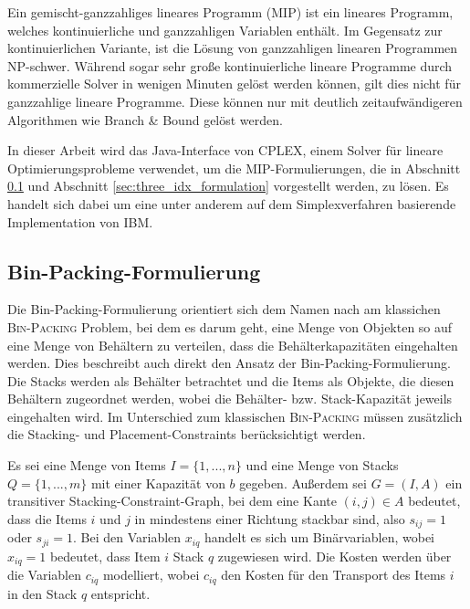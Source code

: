 Ein gemischt-ganzzahliges lineares Programm (MIP) ist ein lineares Programm, welches kontinuierliche und ganzzahligen Variablen
enthält. Im Gegensatz zur kontinuierlichen Variante, ist die Lösung von ganzzahligen linearen Programmen NP-schwer.
Während sogar sehr große kontinuierliche lineare Programme durch kommerzielle Solver in wenigen Minuten gelöst werden können, gilt dies nicht für ganzzahlige lineare Programme. Diese können nur mit deutlich zeitaufwändigeren Algorithmen wie Branch \& Bound gelöst werden.\cite{Brucker2006}

In dieser Arbeit wird das Java-Interface von CPLEX, einem Solver für lineare Optimierungsprobleme verwendet,
um die MIP-Formulierungen, die in Abschnitt \ref{sec:bin_packing_formulation} und Abschnitt \ref{sec:three_idx_formulation} vorgestellt werden,
zu lösen. Es handelt sich dabei um eine unter anderem auf dem Simplexverfahren basierende Implementation von IBM. \cite{CPLEX2015}

\pagebreak

\subsection{Bin-Packing-Formulierung}
\label{sec:bin_packing_formulation}

Die Bin-Packing-Formulierung orientiert sich dem Namen nach am klassichen \textsc{Bin-Packing} Problem, bei dem es darum geht,
eine Menge von Objekten so auf eine Menge von Behältern zu verteilen, dass die Behälterkapazitäten eingehalten werden.
Dies beschreibt auch direkt den Ansatz der Bin-Packing-Formulierung. Die Stacks werden als Behälter betrachtet und die Items als Objekte,
die diesen Behältern zugeordnet werden, wobei die Behälter- bzw. Stack-Kapazität jeweils eingehalten wird. Im Unterschied zum klassischen \textsc{Bin-Packing} müssen zusätzlich die Stacking- und Placement-Constraints berücksichtigt werden.

Es sei eine Menge von Items $I = \{1, ..., n\}$ und eine Menge von Stacks $Q = \{1, ..., m\}$ mit einer Kapazität von $b$ gegeben.
Außerdem sei $G = (I, A)$ ein transitiver Stacking-Constraint-Graph, bei dem eine Kante $(i, j) \in A$ bedeutet,
dass die Items $i$ und $j$ in mindestens einer Richtung stackbar sind, also $s_{ij} = 1$ oder $s_{ji} = 1$.\newline
Bei den Variablen $x_{iq}$ handelt es sich um Binärvariablen, wobei $x_{iq} = 1$ bedeutet, dass Item $i$ Stack $q$ zugewiesen wird.
Die Kosten werden über die Variablen $c_{iq}$ modelliert, wobei $c_{iq}$ den Kosten für den Transport des Items $i$ in den Stack $q$
entspricht.

